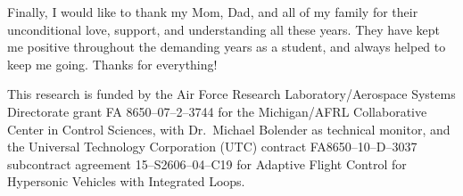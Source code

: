 Finally, I would like to thank my Mom, Dad, and all of my family for their unconditional love, support, and understanding all these years.
They have kept me positive throughout the demanding years as a student, and always helped to keep me going.
Thanks for everything!

This research is funded by the Air Force Research Laboratory/Aerospace Systems Directorate grant FA 8650--07--2--3744 for the Michigan/AFRL Collaborative Center in Control Sciences, with Dr.\ Michael Bolender as technical monitor, and the Universal Technology Corporation (UTC) contract FA8650--10--D--3037 subcontract agreement 15--S2606--04--C19 for Adaptive Flight Control for Hypersonic Vehicles with Integrated Loops.
